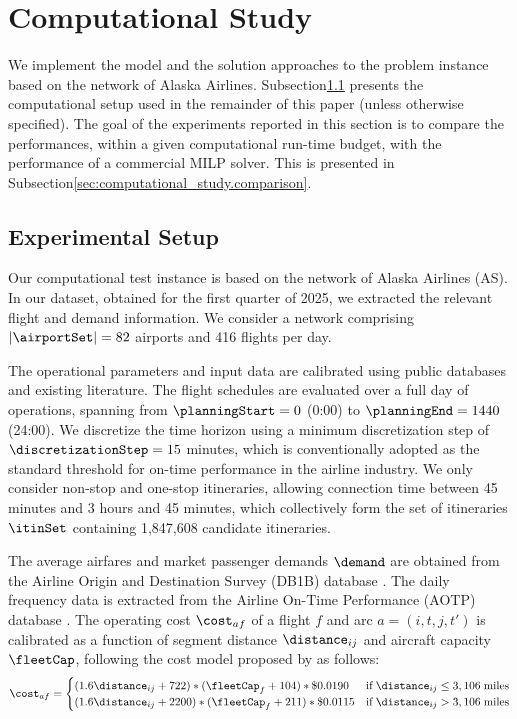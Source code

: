 \chapter{Computational Study}\label{sec:computational_study}
We implement the model and the solution approaches to the problem instance based on the network of Alaska Airlines. Subsection\ref{sec:computational_study.setup} presents the computational setup used in the remainder of this paper (unless otherwise specified). The goal of the experiments reported in this section is to compare the performances, within a given computational run-time budget, with the performance of a commercial MILP solver. This is presented in Subsection\ref{sec:computational_study.comparison}.

\section{Experimental Setup}\label{sec:computational_study.setup}

Our computational test instance is based on the network of Alaska Airlines (AS). In our dataset, obtained for the first quarter of 2025, we extracted the relevant flight and demand information. We consider a network comprising $|\airportSet| = 82$ airports and 416 flights per day. 

The operational parameters and input data are calibrated using public databases and existing literature. The flight schedules are evaluated over a full day of operations, spanning from $\planningStart = 0$ (0:00) to $\planningEnd = 1440$ (24:00). We discretize the time horizon using a minimum discretization step of $\discretizationStep = 15$ minutes, which is conventionally adopted as the standard threshold for on-time performance in the airline industry. We only consider non-stop and one-stop itineraries, allowing connection time between 45 minutes and 3 hours and 45 minutes, which collectively form the set of itineraries $\itinSet$ containing 1,847,608 candidate itineraries.

The average airfares and market passenger demands $\demand$ are obtained from the Airline Origin and Destination Survey (DB1B) database \citep{DOT_DB1B_2025}. The daily frequency data is extracted from the Airline On-Time Performance (AOTP) database \citep{DOT_OTP_2025}. The operating cost $\cost_{af}$ of a flight $f$ and arc $a=(i,t,j,t')$ is calibrated as a function of segment distance $\distance_{ij}$ and aircraft capacity $\fleetCap$, following the cost model proposed by \cite{swan2006aircraft} as follows:
\begin{equation}
  \cost_{af} = \begin{cases}
    (1.6 \distance_{ij} + 722) * (\fleetCap_{f} + 104) * \$0.0190 & \text{if} \;\distance_{ij}\le 3,106\;\text{miles} \\
    (1.6 \distance_{ij} + 2200) * (\fleetCap_{f} + 211) * \$0.0115 & \text{if} \;\distance_{ij}> 3,106\;\text{miles}
  \end{cases}
\end{equation}

